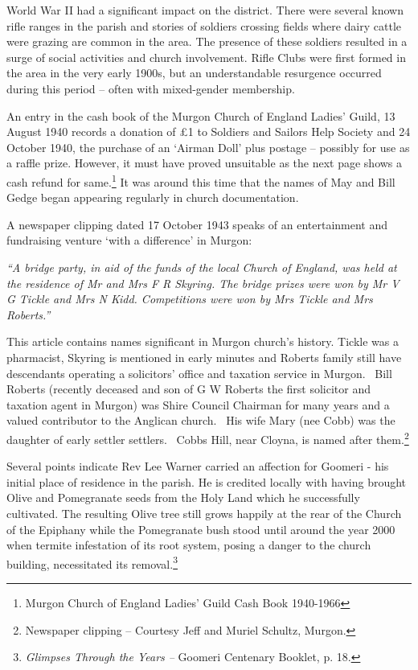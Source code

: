 World War II had a significant impact on the district. There were several known rifle ranges in the parish and stories of soldiers crossing fields where dairy cattle were grazing are common in the area. The presence of these soldiers resulted in a surge of social activities and church involvement. Rifle Clubs were first formed in the area in the very early 1900s, but an understandable resurgence occurred during this period -- often with mixed-gender membership.



An entry in the cash book of the Murgon Church of England Ladies' Guild, 13 August 1940 records a donation of \pounds1 to Soldiers and Sailors Help Society and 24 October 1940, the purchase of an `Airman Doll' plus postage -- possibly for use as a raffle prize. However, it must have proved unsuitable as the next page shows a cash refund for same.\footnote{Murgon Church of England Ladies' Guild Cash Book 1940-1966} It was around this time that the names of May and Bill Gedge began appearing regularly in church documentation.


A newspaper clipping dated 17 October 1943 speaks of an entertainment and fundraising venture `with a difference' in Murgon:



\emph{``A bridge party, in aid of the funds of the local Church of England, was held at the residence of Mr and Mrs F R Skyring. The bridge prizes were won by Mr V G Tickle and Mrs N Kidd. Competitions were won by Mrs Tickle and Mrs Roberts.''}



\smallskip


This article contains names significant in Murgon church's history. Tickle was a pharmacist, Skyring is mentioned in early minutes and Roberts family still have descendants operating a solicitors' office and taxation service in Murgon.~ Bill Roberts (recently deceased and son of G W Roberts the first solicitor and taxation agent in Murgon) was Shire Council Chairman for many years and a valued contributor to the Anglican church.~ His wife Mary (nee Cobb) was the daughter of early settler settlers.~ Cobbs Hill, near Cloyna, is named after them.\footnote{Newspaper clipping -- Courtesy Jeff and Muriel Schultz, Murgon.}


Several points indicate Rev Lee Warner carried an affection for Goomeri - his initial place of residence in the parish. He is credited locally with having brought Olive and Pomegranate seeds from the Holy Land which he successfully cultivated. The resulting Olive tree still grows happily at the rear of the Church of the Epiphany while the Pomegranate bush stood until around the year 2000 when termite infestation of its root system, posing a danger to the church building, necessitated its removal.\footnote{\emph{Glimpses Through the Years --} Goomeri Centenary Booklet, p. 18.}


